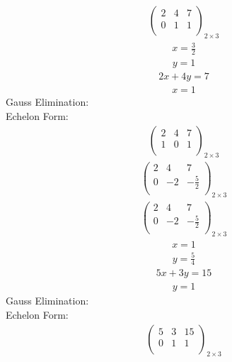 \documentclass{article}
\begin{document}
\begin{align*}
\left(
\begin{array}{cc|c}
2 & 4 & 7\\
0 & 1 & 1\\
\end{array}
\right)_{2\times 3}
\end{align*}
\begin{align*}
x=\frac{3}{2}\end{align*}
\begin{align*}
y=1\end{align*}
\begin{align*}
2x + 4y=7\end{align*}
\begin{align*}
x=1\end{align*}
Gauss Elimination:\\
Echelon Form:\\
\begin{align*}
\left(
\begin{array}{cc|c}
2 & 4 & 7\\
1 & 0 & 1\\
\end{array}
\right)_{2\times 3}
\end{align*}
\begin{align*}
\left(
\begin{array}{cc|c}
2 & 4 & 7\\
0 & -2 & -\frac{5}{2}\\
\end{array}
\right)_{2\times 3}
\end{align*}
\begin{align*}
\left(
\begin{array}{cc|c}
2 & 4 & 7\\
0 & -2 & -\frac{5}{2}\\
\end{array}
\right)_{2\times 3}
\end{align*}
\begin{align*}
x=1\end{align*}
\begin{align*}
y=\frac{5}{4}\end{align*}
\begin{align*}
5x + 3y=15\end{align*}
\begin{align*}
y=1\end{align*}
Gauss Elimination:\\
Echelon Form:\\
\begin{align*}
\left(
\begin{array}{cc|c}
5 & 3 & 15\\
0 & 1 & 1\\
\end{array}
\right)_{2\times 3}
\end{align*}
\end{document}
